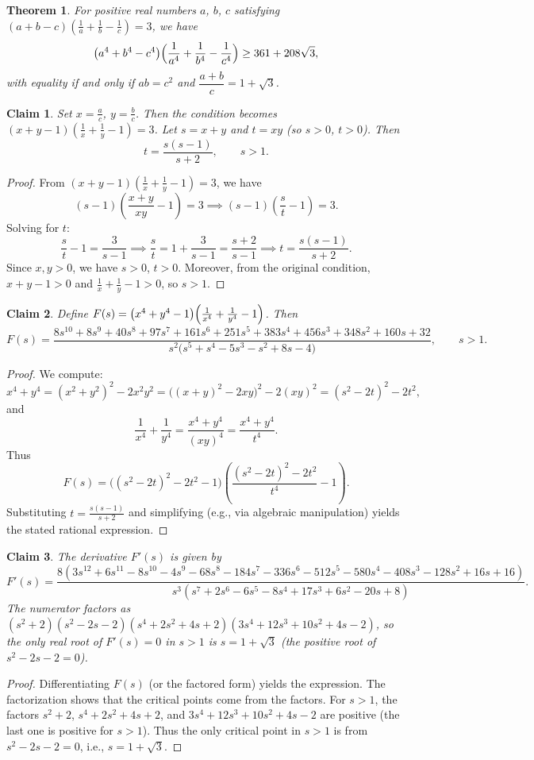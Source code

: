 \documentclass{article}
\newtheorem{theorem}{Theorem}
\newtheorem{claim}{Claim}
\begin{document}
\begin{theorem}
For positive real numbers $a$, $b$, $c$ satisfying $(a+b-c)\left(\frac{1}{a}+\frac{1}{b}-\frac{1}{c}\right)=3$, we have
\[
\bigl(a^{4}+b^{4}-c^{4}\bigr)\Bigl(\frac{1}{a^{4}}+\frac{1}{b^{4}}-\frac{1}{c^{4}}\Bigr)\ge 361+208\sqrt{3},
\]
with equality if and only if $ab=c^{2}$ and $\dfrac{a+b}{c}=1+\sqrt{3}$.
\end{theorem}

\begin{claim}
Set $x=\frac{a}{c}$, $y=\frac{b}{c}$. Then the condition becomes $(x+y-1)\left(\frac{1}{x}+\frac{1}{y}-1\right)=3$. Let $s=x+y$ and $t=xy$ (so $s>0$, $t>0$). Then
\[
t=\frac{s(s-1)}{s+2},\qquad s>1.
\]
\end{claim}
\begin{proof}
From $(x+y-1)\left(\frac{1}{x}+\frac{1}{y}-1\right)=3$, we have
\[
(s-1)\left(\frac{x+y}{xy}-1\right)=3 \implies (s-1)\left(\frac{s}{t}-1\right)=3.
\]
Solving for $t$:
\[
\frac{s}{t}-1 = \frac{3}{s-1} \implies \frac{s}{t} = 1 + \frac{3}{s-1} = \frac{s+2}{s-1} \implies t = \frac{s(s-1)}{s+2}.
\]
Since $x,y>0$, we have $s>0$, $t>0$. Moreover, from the original condition, $x+y-1>0$ and $\frac{1}{x}+\frac{1}{y}-1>0$, so $s>1$.
\end{proof}

\begin{claim}
Define $F(s) = \bigl(x^{4}+y^{4}-1\bigr)\Bigl(\frac{1}{x^{4}}+\frac{1}{y^{4}}-1\Bigr)$. Then
\[
F(s)=\frac{8s^{10}+8s^{9}+40s^{8}+97s^{7}+161s^{6}+251s^{5}+383s^{4}+456s^{3}+348s^{2}+160s+32}
      {s^{2}\bigl(s^{5}+s^{4}-5s^{3}-s^{2}+8s-4\bigr)},\qquad s>1.
\]
\end{claim}
\begin{proof}
We compute:
\[
x^{4}+y^{4} = (x^{2}+y^{2})^{2}-2x^{2}y^{2} = \bigl((x+y)^{2}-2xy\bigr)^{2}-2(xy)^{2} = (s^{2}-2t)^{2}-2t^{2},
\]
and
\[
\frac{1}{x^{4}}+\frac{1}{y^{4}} = \frac{x^{4}+y^{4}}{(xy)^{4}} = \frac{x^{4}+y^{4}}{t^{4}}.
\]
Thus
\[
F(s) = \bigl((s^{2}-2t)^{2}-2t^{2}-1\bigr)\left(\frac{(s^{2}-2t)^{2}-2t^{2}}{t^{4}}-1\right).
\]
Substituting $t = \frac{s(s-1)}{s+2}$ and simplifying (e.g., via algebraic manipulation) yields the stated rational expression.
\end{proof}

\begin{claim}
The derivative $F'(s)$ is given by
\[
F'(s)=\frac{8(3s^{12}+6s^{11}-8s^{10}-4s^{9}-68s^{8}-184s^{7}-336s^{6}-512s^{5}-580s^{4}-408s^{3}-128s^{2}+16s+16)}
          {s^{3}(s^{7}+2s^{6}-6s^{5}-8s^{4}+17s^{3}+6s^{2}-20s+8)}.
\]
The numerator factors as $(s^{2}+2)(s^{2}-2s-2)(s^{4}+2s^{2}+4s+2)(3s^{4}+12s^{3}+10s^{2}+4s-2)$, so the only real root of $F'(s)=0$ in $s>1$ is $s=1+\sqrt{3}$ (the positive root of $s^{2}-2s-2=0$).
\end{claim}
\begin{proof}
Differentiating $F(s)$ (or the factored form) yields the expression. The factorization shows that the critical points come from the factors. For $s>1$, the factors $s^{2}+2$, $s^{4}+2s^{2}+4s+2$, and $3s^{4}+12s^{3}+10s^{2}+4s-2$ are positive (the last one is positive for $s>1$). Thus the only critical point in $s>1$ is from $s^{2}-2s-2=0$, i.e., $s=1+\sqrt{3}$.
\end{proof}
\end{document}
